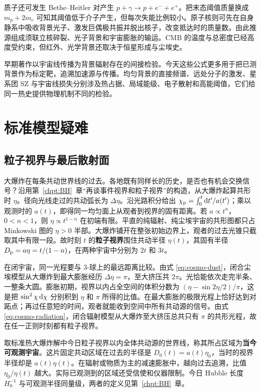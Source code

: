 质子还可发生 Bethe--Heitler 对产生 $p+\gamma\to p+e^-+e^+$。把末态阈值质量换成 $m_p+2m_e$ 可知其阈值低于介子产生，但每次失能比例较小。原子核则可先在自身静系中吸收背景光子、激发巨偶极共振并脱出核子，改变抵达时的质量数。由此推源组成须联立核碎裂、光子背景和宇宙膨胀的输运。CMB 的温度与总密度已经高度受约束，但红外、光学背景还取决于恒星形成与尘埃史。

早期著作以宇宙线传播为背景辐射存在的间接检验。今天这些公式更多用于把已测背景作为标定靶，追溯加速源与传播。均匀背景的直接频谱、远处分子的激发、星系团 SZ 与宇宙线损失分别涉及热占据、局域能级、电子散射和高能阈值，它们给同一热史提供物理机制不同的检验。

\section{标准模型疑难}\label{sec:cosmo-problems}

\subsection{粒子视界与最后散射面}

大爆炸在每条共动世界线的过去。各地既有同样长的历史，是否也有机会交换信号？沿用第~\ref{chpt:BH}~章“再谈事件视界和粒子视界”的构造，从大爆炸起算共形时 $\eta$。径向光线走过的共动弧长为 $\Delta\eta$。沿光路积分给出 $\chi_{\rm p}=\int_0^t\dd t^{\prime}/a(t^{\prime})$；乘以观测时的 $a(t)$，即得同一均匀面上从观者到视界的固有距离。若 $a\propto t^n$，$0<n<1$，则 $\eta\propto t^{1-n}$ 在初端有限。平直的纯辐射、纯尘埃宇宙的共形图都只占 Minkowski 图的 $\eta>0$ 半部。大爆炸铺开在整张初始边界上，观者的过去光锥只截取其中有限一段。故时刻 $t$ 的\textbf{粒子视界}围住共动半径 $\eta(t)$，其固有半径 $D_{\rm p}=a\eta=t/(1-n)$，在两种宇宙中分别为 $2t$ 和 $3t$。

在闭宇宙，同一光程要与 3-球上的最远距离比较。由式 \eqref{eq:cosmo-dust}，闭合尘埃模型从大爆炸到最大膨胀经历 $\Delta\eta=\pi$，至大挤压共 $2\pi$。光恰能依次走完半条、一整条大圆。膨胀初期，视界以内占全空间的体积分数为 $(\eta-\sin 2\eta/2)/\pi$，这是把 $\sin^2\chi\,\dd\chi$ 分别积到 $\eta$ 和 $\pi$ 所得的比值。在最大膨胀的极限光程上恰好达到对跖点；再过任意短的时间，观者就能收到空间中所有共动源的信号。由式 \eqref{eq:cosmo-radiation}，闭合辐射模型从大爆炸至大挤压总共只有 $\pi$ 的共形光程，故在任一正则时刻都有粒子视界。

取标准热大爆炸解中今日粒子视界以内全体共动源的世界线，称其所占区域为\textbf{当今可观测宇宙}。这片固定共动区域在过去的半径是 $D_0(t)=a(t)\eta_0$，当时的视界半径却是 $a(t)\eta(t)$。在辐射或物质为主的减速膨胀中，越向过去追溯，比值 $\eta_0/\eta(t)$ 越大。实际已观测到的区域还受信使和仪器限制。今日 Hubble 长度 $H_0^{-1}$ 与可观测半径同量级，两者的定义见第~\ref{chpt:BH}~章。

